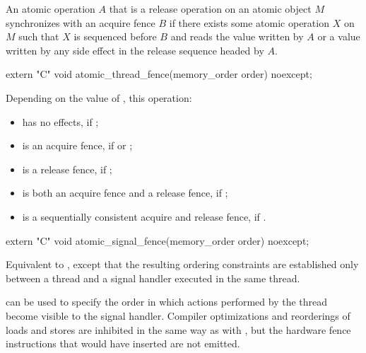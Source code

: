 \pnum
An atomic operation $A$ that is a release operation on an atomic object
$M$ synchronizes with an acquire fence $B$ if there exists some atomic
operation $X$ on $M$ such that $X$ is sequenced before $B$
and reads the value written by $A$ or a value written by any side effect in the
release sequence headed by $A$.

%
\begin{itemdecl}
extern "C" void atomic_thread_fence(memory_order order) noexcept;
\end{itemdecl}

\begin{itemdescr}
\pnum
\effects
Depending on the value of , this operation:
\begin{itemize}
\item has no effects, if ;

\item is an acquire fence, if  or ;

\item is a release fence, if ;

\item is both an acquire fence and a release fence, if ;

\item is a sequentially consistent acquire and release fence, if .
\end{itemize}
\end{itemdescr}

%
\begin{itemdecl}
extern "C" void atomic_signal_fence(memory_order order) noexcept;
\end{itemdecl}

\begin{itemdescr}
\pnum
\effects
Equivalent to , except that
the resulting ordering constraints are established only between a thread and a
signal handler executed in the same thread.

\pnum
\begin{note}
 can be used to specify the order in which actions
performed by the thread become visible to the signal handler.
Compiler optimizations and reorderings of loads and stores are inhibited in
the same way as with , but the hardware fence instructions
that  would have inserted are not emitted.
\end{note}
\end{itemdescr}
